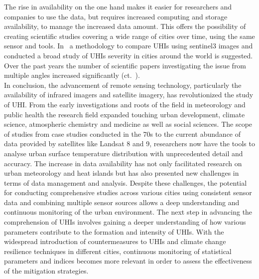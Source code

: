 \documentclass[12pt,a4paper, english,twoside]{article}
\begin{document}
  The rise in availability on the one hand makes it easier for researchers and companies to use the data, but requires increased computing and storage availability, to manage the increased data amount.
  This offers the possibility of creating scientific studies covering a wide range of cities over time, using the same sensor and tools. 
  In~\cite{Sobrino2020} a methodology to compare \glspl{UHI} using \gls{sentinel3} images and conducted a broad study of \glspl{UHI} severity in cities around the world is suggested.
  Over the past years the number of scientific papers investigating the issue from multiple angles increased significantly (ct.~\cite[P. 3]{Piracha2022b}).\\
  In conclusion, the advancement of remote sensing technology, particularly the availability of infrared imagers and satellite imagery, has revolutionized the study of \gls{UHI}. 
  From the early investigations and roots of the field in meteorology and public health the research field expanded touching urban development, climate science, atmospheric chemistry and medicine as well as social sciences.
  The scope of studies from case studies conducted in the 70s to the current abundance of data provided by satellites like Landsat 8 and 9, researchers now have the tools to analyse urban surface temperature distribution with unprecedented detail and accuracy.
  The increase in data availability has not only facilitated research on urban meteorology and heat islands but has also presented new challenges in terms of data management and analysis.
  Despite these challenges, the potential for conducting comprehensive studies across various cities using consistent sensor data and combining multiple sensor sources allows a deep understanding and continuous monitoring of the urban environment.
  The next step in advancing the comprehension of \glspl{UHI} involves gaining a deeper understanding of how various parameters contribute to the formation and intensity of \glspl{UHI}.
  With the widespread introduction of countermeasures to \glspl{UHI} and climate change resilience techniques in different cities, continuous monitoring of statistical parameters and indices becomes more relevant in order to assess the effectiveness of the mitigation strategies. 
\end{document}
